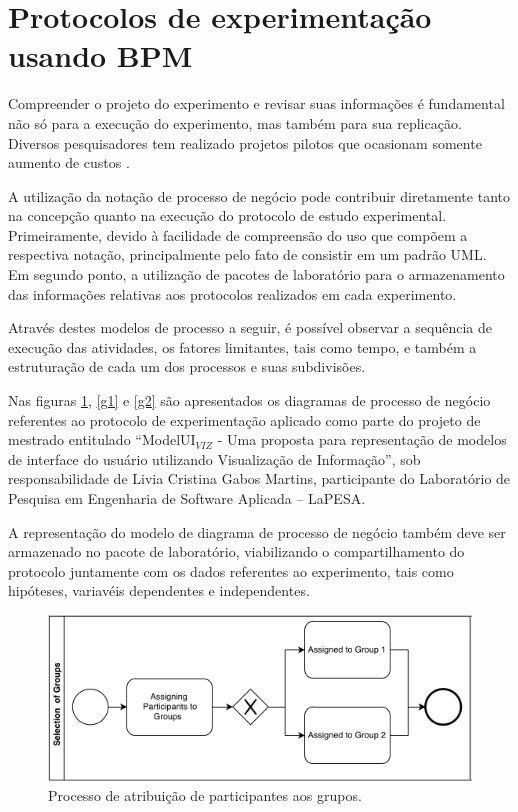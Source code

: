 \section{Protocolos de experimentação usando BPM}

Compreender o projeto do experimento e revisar suas informações é fundamental não só para a execução do experimento, mas também para sua replicação. Diversos pesquisadores tem realizado projetos pilotos que ocasionam somente aumento de custos \cite{Kitchenham2008}. 

A utilização da notação de processo de negócio pode contribuir diretamente tanto na concepção quanto na execução do protocolo de estudo experimental. Primeiramente, devido à facilidade de compreensão do uso que compõem a respectiva notação, principalmente pelo fato de consistir em um padrão UML. Em segundo ponto, a utilização de pacotes de laboratório para o armazenamento das informações relativas aos protocolos realizados em cada experimento.

Através destes modelos de processo a seguir, é possível observar a sequência de execução das atividades, os fatores limitantes, tais como tempo, e também a estruturação de cada um dos processos e suas subdivisões.

Nas figuras \ref{selecao}, \ref{g1} e \ref{g2} são apresentados os diagramas de processo de negócio referentes ao protocolo de experimentação aplicado como parte do projeto de mestrado entitulado ``ModelUI$_{VIZ}$ - Uma proposta para representação de modelos de interface do usuário utilizando Visualização de Informação'', sob responsabilidade de Livia Cristina Gabos Martins, participante do Laboratório de Pesquisa em Engenharia de Software Aplicada -- LaPESA.

A representação do modelo de diagrama de processo de negócio também deve ser armazenado no pacote de laboratório, viabilizando o compartilhamento do protocolo juntamente com os dados referentes ao experimento, tais como hipóteses, variavéis dependentes e independentes.

\begin{figure}[!ht]
\centering
\includegraphics[scale=0.7]{images/selecao.png}
\caption{Processo de atribuição de participantes aos grupos.}
\label{selecao}
\end{figure}


